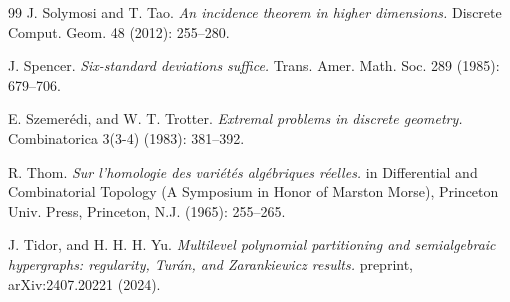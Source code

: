 \documentclass[11pt]{article}
\theoremstyle{plain}
\theoremstyle{definition}
\begin{document}
\begin{thebibliography}{99}
		J. Solymosi and T. Tao.
		\emph{An incidence theorem in higher dimensions.}
		Discrete Comput. Geom. 48 (2012): 255--280.
		
		J. Spencer. \emph{Six-standard deviations suffice.} Trans. Amer. Math. Soc. 289 (1985): 679--706.
		
		E. Szemer\'edi, and W. T. Trotter. 
		\emph{Extremal problems in discrete geometry.}
		Combinatorica 3(3-4) (1983): 381--392. 
		
		R. Thom. \emph{Sur l'homologie des vari\'et\'es alg\'ebriques r\'eelles.}
		in Differential and Combinatorial Topology (A Symposium in Honor of Marston Morse), Princeton Univ. Press, Princeton, N.J. (1965): 255--265.
		
		J. Tidor, and H. H. H. Yu. 
		\emph{Multilevel polynomial partitioning and semialgebraic hypergraphs: regularity, Tur\'an, and Zarankiewicz results.}
		preprint, arXiv:2407.20221 (2024).
	\end{thebibliography}
\end{document}
